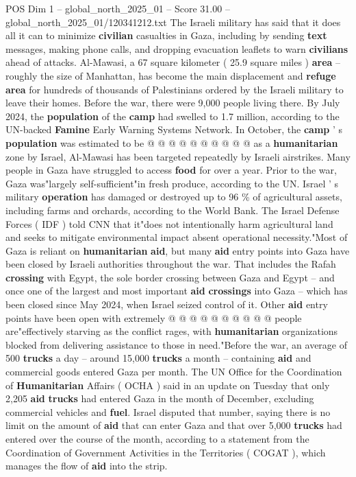 \begin{textsample}{POS Dim 1 – global\_north\_2025\_01 – Score 31.00 – global\_north\_2025\_01/120341212.txt}
The Israeli military has said that it does all it can to minimize \textbf{civilian} casualties in Gaza, including by sending \textbf{text} messages, making phone calls, and dropping evacuation leaflets to warn \textbf{civilians} ahead of attacks.
Al-Mawasi, a 67 square kilometer ( 25.9 square miles ) \textbf{area} -- roughly the size of Manhattan, has become the main displacement and \textbf{refuge} \textbf{area} for hundreds of thousands of Palestinians ordered by the Israeli military to leave their homes.
Before the war, there were 9,000 people living there.
By July 2024, the \textbf{population} of the \textbf{camp} had swelled to 1.7 million, according to the UN-backed \textbf{Famine} Early Warning Systems Network.
In October, the \textbf{camp} ' s \textbf{population} was estimated to be @ @ @ @ @ @ @ @ @ @ as a \textbf{humanitarian} zone by Israel, Al-Mawasi has been targeted repeatedly by Israeli airstrikes.
Many people in Gaza have struggled to access \textbf{food} for over a year.
Prior to the war, Gaza was"largely self-sufficient"in fresh produce, according to the UN.
Israel ' s military \textbf{operation} has damaged or destroyed up to 96 \% of agricultural assets, including farms and orchards, according to the World Bank.
The Israel Defense Forces ( IDF ) told CNN that it"does not intentionally harm agricultural land and seeks to mitigate environmental impact absent operational necessity."Most of Gaza is reliant on \textbf{humanitarian} \textbf{aid}, but many \textbf{aid} entry points into Gaza have been closed by Israeli authorities throughout the war.
That includes the Rafah \textbf{crossing} with Egypt, the sole border crossing between Gaza and Egypt -- and once one of the largest and most important \textbf{aid} \textbf{crossings} into Gaza -- which has been closed since May 2024, when Israel seized control of it.
Other \textbf{aid} entry points have been open with extremely @ @ @ @ @ @ @ @ @ @ people are"effectively starving as the conflict rages, with \textbf{humanitarian} organizations blocked from delivering assistance to those in need."Before the war, an average of 500 \textbf{trucks} a day -- around 15,000 \textbf{trucks} a month -- containing \textbf{aid} and commercial goods entered Gaza per month.
The UN Office for the Coordination of \textbf{Humanitarian} Affairs ( OCHA ) said in an update on Tuesday that only 2,205 \textbf{aid} \textbf{trucks} had entered Gaza in the month of December, excluding commercial vehicles and \textbf{fuel}.
Israel disputed that number, saying there is no limit on the amount of \textbf{aid} that can enter Gaza and that over 5,000 \textbf{trucks} had entered over the course of the month, according to a statement from the Coordination of Government Activities in the Territories ( COGAT ), which manages the flow of \textbf{aid} into the strip.

\end{textsample}
